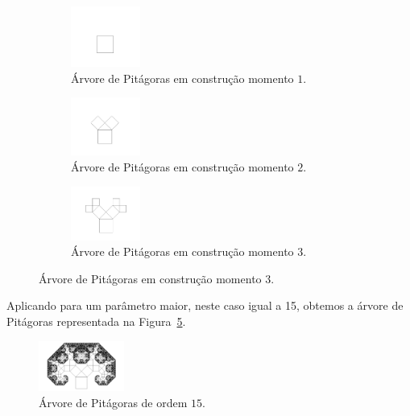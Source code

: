 \documentclass[a4paper]{article}
\begin{document}
\begin{enumerate}
\begin{figure}
%
\begin{subfigure}{0.5\textwidth}
\centering
\includegraphics[width=0.25\textwidth]{imgs/animate1.png}
\caption{Árvore de Pitágoras em construção momento $1$.}
\label{fig:animate1}
\end{subfigure}
%
\begin{subfigure}{0.5\textwidth}
\centering
\includegraphics[width=0.25\textwidth]{imgs/animate2.png}
\caption{Árvore de Pitágoras em construção momento $2$.}
\label{fig:animate1}
\end{subfigure}
%
\begin{subfigure}{0.5\textwidth}
\centering
\includegraphics[width=0.25\textwidth]{imgs/animate3.png}
\caption{Árvore de Pitágoras em construção momento $3$.}
\label{fig:animate3}
\end{subfigure}
%
\end{figure}

Aplicando para um parâmetro maior, neste caso igual a 15, obtemos a
árvore de Pitágoras representada na Figura~\ref{fig:animate15}.

\begin{figure}
\begin{center}
\includegraphics[width=0.25\textwidth]{imgs/animate15.png}
\end{center}
\caption{Árvore de Pitágoras de ordem $15$.}
\label{fig:animate15}
\end{figure}


\end{enumerate}
\end{document}
